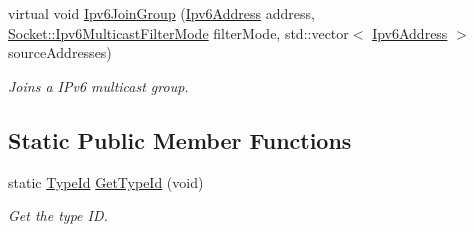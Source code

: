 \begin{DoxyCompactItemize}
virtual void \hyperlink{classns3_1_1UdpSocketImpl_a65ec9e22618155ac74695a2ac7e24695}{Ipv6\+Join\+Group} (\hyperlink{classns3_1_1Ipv6Address}{Ipv6\+Address} address, \hyperlink{classns3_1_1Socket_a96f39fe2b73d5691b319093a1e31615d}{Socket\+::\+Ipv6\+Multicast\+Filter\+Mode} filter\+Mode, std\+::vector$<$ \hyperlink{classns3_1_1Ipv6Address}{Ipv6\+Address} $>$ source\+Addresses)
\begin{DoxyCompactList}\small\item\em Joins a I\+Pv6 multicast group. \end{DoxyCompactList}\end{DoxyCompactItemize}
\subsection*{Static Public Member Functions}
\begin{DoxyCompactItemize}
\item 
static \hyperlink{classns3_1_1TypeId}{Type\+Id} \hyperlink{classns3_1_1UdpSocketImpl_a4412f79ef3f0597cc1ac0dcf8922ee3a}{Get\+Type\+Id} (void)
\begin{DoxyCompactList}\small\item\em Get the type ID. \end{DoxyCompactList}\end{DoxyCompactItemize}
